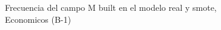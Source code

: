 \begin{figure}[H]
    \centering
    
    \caption{Frecuencia del campo M built en el modelo real y smote, Economicos (B-1)}
    \label{frecuency-M Built-smote-enc}
\end{figure}